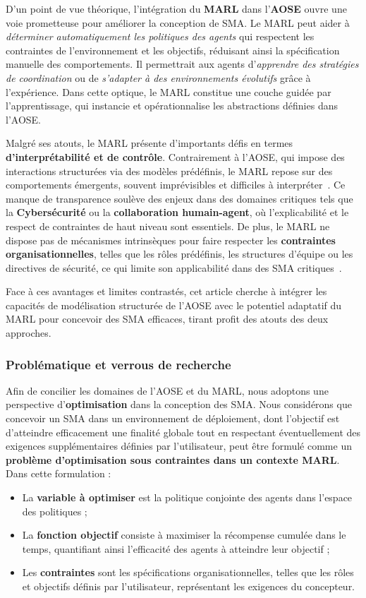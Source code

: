 D'un point de vue théorique, l'intégration du \textbf{MARL} dans l'\textbf{AOSE} ouvre une voie prometteuse pour améliorer la conception de SMA. Le MARL peut aider à \textit{déterminer automatiquement les politiques des agents} qui respectent les contraintes de l'environnement et les objectifs, réduisant ainsi la spécification manuelle des comportements. Il permettrait aux agents d'\textit{apprendre des stratégies de coordination} ou de \textit{s'adapter à des environnements évolutifs} grâce à l'expérience. Dans cette optique, le MARL constitue une couche guidée par l'apprentissage, qui instancie et opérationnalise les abstractions définies dans l'AOSE.

Malgré ses atouts, le MARL présente d'importants défis en termes \textbf{d'interprétabilité et de contrôle}. Contrairement à l'AOSE, qui impose des interactions structurées via des modèles prédéfinis, le MARL repose sur des comportements émergents, souvent imprévisibles et difficiles à interpréter~\cite{Du2022}. Ce manque de transparence soulève des enjeux dans des domaines critiques tels que la \textbf{Cybersécurité} ou la \textbf{collaboration humain-agent}, où l'explicabilité et le respect de contraintes de haut niveau sont essentiels. De plus, le MARL ne dispose pas de mécanismes intrinsèques pour faire respecter les \textbf{contraintes organisationnelles}, telles que les rôles prédéfinis, les structures d'équipe ou les directives de sécurité, ce qui limite son applicabilité dans des SMA critiques~\cite{Nguyen2020}.

Face à ces avantages et limites contrastés, cet article cherche à intégrer les capacités de modélisation structurée de l'AOSE avec le potentiel adaptatif du MARL pour concevoir des SMA efficaces, tirant profit des atouts des deux approches.

\subsubsection{Problématique et verrous de recherche}

Afin de concilier les domaines de l'AOSE et du MARL, nous adoptons une perspective d'\textbf{optimisation} dans la conception des SMA. Nous considérons que concevoir un SMA dans un environnement de déploiement, dont l'objectif est d'atteindre efficacement une finalité globale tout en respectant éventuellement des exigences supplémentaires définies par l'utilisateur, peut être formulé comme un \textbf{problème d'optimisation sous contraintes dans un contexte MARL}. Dans cette formulation :
\begin{itemize}
    \item La \textbf{variable à optimiser} est la politique conjointe des agents dans l'espace des politiques ;
    \item La \textbf{fonction objectif} consiste à maximiser la récompense cumulée dans le temps, quantifiant ainsi l'efficacité des agents à atteindre leur objectif ;
    \item Les \textbf{contraintes} sont les spécifications organisationnelles, telles que les rôles et objectifs définis par l'utilisateur, représentant les exigences du concepteur.
\end{itemize}

